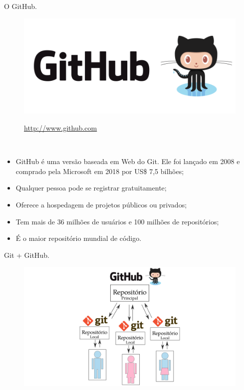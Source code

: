 \documentclass[brazil,aspectratio=169]{beamer}
\begin{document}
\begin{frame}{O GitHub.}

  \begin{figure}
    \centering
    \includegraphics[scale=0.35]{imagens/github-logo}

    \url{http://www.github.com}
  \end{figure}

  \begin{block}{\ }
    \begin{itemize}
      \item GitHub é uma versão baseada em Web do Git. Ele foi lançado em 2008 e comprado
      pela Microsoft em 2018 por US\$ 7,5 bilhões;
      \item Qualquer pessoa pode se registrar gratuitamente;
      \item Oferece a hospedagem de projetos públicos ou privados;
      \item Tem mais de 36 milhões de usuários e 100 milhões de repositórios;
      \item É o maior repositório mundial de código.
    \end{itemize}
  \end{block}
  
\end{frame}

\begin{frame}{Git + GitHub.}

  \begin{figure}
    \centering
    \includegraphics[scale=0.35]{imagens/git_e_github}
  \end{figure}
  
\end{frame}
\end{document}
